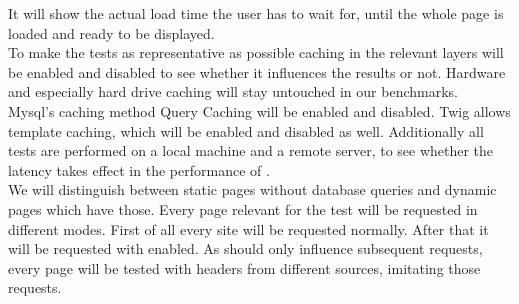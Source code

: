 It will show the actual load time the user has to wait for, until the whole page is loaded and ready to be displayed.
\\
To make the tests as representative as possible caching in the relevant layers will be enabled and disabled to see whether it influences the results or not.
Hardware and especially hard drive caching will stay untouched in our benchmarks.
\\
Mysql's caching method Query Caching will be enabled and disabled.
Twig allows template caching, which will be enabled and disabled as well.
Additionally all tests are performed on a local machine and a remote server, to see whether the latency takes effect in the performance of \lare{}.
\\
We will distinguish between static pages without database queries and dynamic pages which have those.
Every page relevant for the test will be requested in different modes.
First of all every site will be requested normally.
After that it will be requested with \lare{} enabled.
As \lare{} should only influence subsequent requests, every page will be tested with \http{} headers from different sources, imitating those requests.

%
%
%


